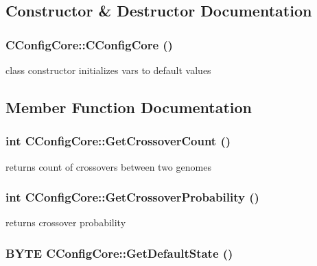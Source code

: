 \subsection{Constructor \& Destructor Documentation}
\hypertarget{classCConfigCore_a09fdbc421e962fcd0b5ade4db4b21f81}{
\subsubsection[{CConfigCore}]{\setlength{\rightskip}{0pt plus 5cm}CConfigCore::CConfigCore ()}}
\label{classCConfigCore_a09fdbc421e962fcd0b5ade4db4b21f81}
class constructor initializes vars to default values 

\subsection{Member Function Documentation}
\hypertarget{classCConfigCore_a655427dab1a00f887346059ad49f4b68}{
\subsubsection[{GetCrossoverCount}]{\setlength{\rightskip}{0pt plus 5cm}int CConfigCore::GetCrossoverCount ()}}
\label{classCConfigCore_a655427dab1a00f887346059ad49f4b68}
returns count of crossovers between two genomes \hypertarget{classCConfigCore_a6d6c069032db9af483f3a8c3c32fb0be}{
\subsubsection[{GetCrossoverProbability}]{\setlength{\rightskip}{0pt plus 5cm}int CConfigCore::GetCrossoverProbability ()}}
\label{classCConfigCore_a6d6c069032db9af483f3a8c3c32fb0be}
returns crossover probability \hypertarget{classCConfigCore_a7623630f4d5737b312f729d312586133}{
\subsubsection[{GetDefaultState}]{\setlength{\rightskip}{0pt plus 5cm}BYTE CConfigCore::GetDefaultState ()}}
